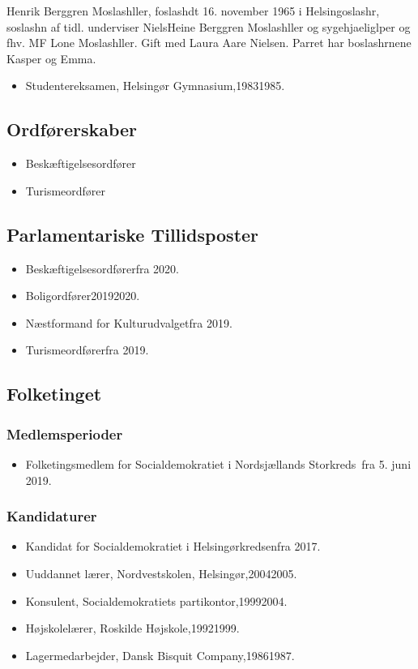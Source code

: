 \documentclass[11pt, a4paper]{awesome-cv}
\begin{document}
\makecvheader[R]
\makelettertitle
\begin{cvletter}
Henrik Berggren Moslashller, foslashdt 16. november 1965 i Helsingoslashr, soslashn af tidl. underviser NielsHeine Berggren Moslashller og sygehjaeliglper og fhv. MF Lone Moslashller. Gift med Laura Aare Nielsen. Parret har boslashrnene Kasper og Emma.

\begin{itemize}
\item Studentereksamen, Helsingør Gymnasium,19831985.
\end{itemize}
\subsection*{Ordførerskaber}
\begin{itemize}
\item Beskæftigelsesordfører
\item Turismeordfører
\end{itemize}
\subsection*{Parlamentariske Tillidsposter}
\begin{itemize}
\item Beskæftigelsesordførerfra 2020.
\item Boligordfører20192020.
\item Næstformand for Kulturudvalgetfra 2019.
\item Turismeordførerfra 2019.
\end{itemize}
\subsection*{Folketinget}
\subsubsection*{Medlemsperioder}
\begin{itemize}
\item Folketingsmedlem for Socialdemokratiet i Nordsjællands Storkreds fra 5. juni 2019.
\end{itemize}
\subsubsection*{Kandidaturer}
\begin{itemize}
\item Kandidat for Socialdemokratiet i Helsingørkredsenfra 2017.
\end{itemize}
\begin{itemize}
\item Uuddannet lærer, Nordvestskolen, Helsingør,20042005.
\item Konsulent, Socialdemokratiets partikontor,19992004.
\item Højskolelærer, Roskilde Højskole,19921999.
\item Lagermedarbejder, Dansk Bisquit Company,19861987.
\end{itemize}
\end{cvletter}
\end{document}
